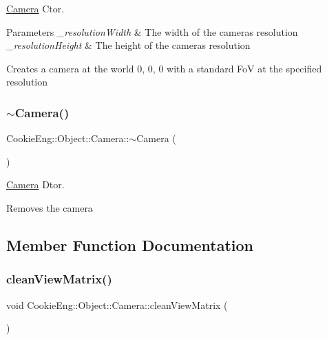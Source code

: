 \hyperlink{class_cookie_eng_1_1_object_1_1_camera}{Camera} Ctor. 


\begin{DoxyParams}{Parameters}
{\em \+\_\+resolution\+Width} & The width of the camera\textquotesingle{}s resolution \\
\hline
{\em \+\_\+resolution\+Height} & The height of the camera\textquotesingle{}s resolution\\
\hline
\end{DoxyParams}
Creates a camera at the world 0, 0, 0 with a standard FoV at the specified resolution \mbox{\label{class_cookie_eng_1_1_object_1_1_camera_a8d672ca800d63af6fe3d6665471a2b05}} 
\subsubsection{\texorpdfstring{$\sim$\+Camera()}{~Camera()}}
{\footnotesize\ttfamily Cookie\+Eng\+::\+Object\+::\+Camera\+::$\sim$\+Camera (\begin{DoxyParamCaption}{ }\end{DoxyParamCaption})\hspace{0.3cm}{\ttfamily [inline]}}



\hyperlink{class_cookie_eng_1_1_object_1_1_camera}{Camera} Dtor. 

Removes the camera 

\subsection{Member Function Documentation}
\mbox{\label{class_cookie_eng_1_1_object_1_1_camera_ab18117758ca6a8d4fab5b9370bc14b96}} 
\subsubsection{\texorpdfstring{clean\+View\+Matrix()}{cleanViewMatrix()}}
{\footnotesize\ttfamily void Cookie\+Eng\+::\+Object\+::\+Camera\+::clean\+View\+Matrix (\begin{DoxyParamCaption}{ }\end{DoxyParamCaption})\hspace{0.3cm}{\ttfamily [protected]}}



